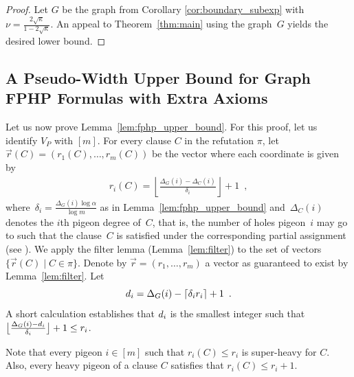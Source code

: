 \documentclass{theoretics}
\newcommand{\ceiling}[1]{\lceil #1 \rceil}
\newcommand{\Floor}[1]{\bigl \lfloor #1 \bigr \rfloor}
\newcommand{\FLOOR}[1]{\left \lfloor #1 \right \rfloor}
\newcommand{\set}[1]{\{ #1 \}}
\newcommand{\eqperiod}{\enspace .}
\newcommand{\eqcomma}{\enspace ,}
\newcommand{\refth}[1]{Theorem~\ref{#1}}
\newcommand{\reflem}[1]{Lemma~\ref{#1}}
\newcommand{\refpi}{\pi}
\newcommand{\heavy}{heavy\xspace}
\newcommand{\sheavy}{super-heavy\xspace}
\renewcommand{\deg}[2][XXXXXXXXXXXX]{\Delta_{#1}(#2)}
\newcommand{\V}[1][]{V_{#1}}
\newcommand{\Vp}{\V[P]}
\newcommand{\thr}[1]{ \ensuremath d_{{#1}} }
\newcommand{\adv}[1]{\delta_{{#1}}}
\newcommand{\PSEUDOWIDTH}{Pseudo-Width\xspace}
\newcommand{\ri}[1]{r_{#1}}
\newcommand{\riof}[2]{r_{#2}(#1)}
\newcommand{\vecr}{\vec{r}}
\newcommand{\vecrof}[1]{\vec{r}(#1)}
\newcommand{\vecrdef}[1]{\vecr = \left(\ri{1}, \ldots, \ri{#1}\right)}
\newcommand{\vecrofdef}[2]{\vecrof{#1} = 
\left(\riof{#1}{1}, \ldots, \riof{#1}{#2}\right)}
\newcommand{\squeezesubsection}[1]{\subsection{#1}}
\numberwithin{equation}{section}
\begin{document}
\begin{proof}
  Let $G$ be the graph from Corollary \ref{cor:boundary_subexp} with
  $\nu = \frac{ 2\sqrt{\kappa} }{ 1 - 2\sqrt{\kappa} }$.
  An appeal to \refth{thm:main} using the graph~$G$ yields 
  the desired lower bound.
\end{proof}






 
\squeezesubsection{A \PSEUDOWIDTH Upper Bound for Graph FPHP Formulas
  with Extra Axioms}
\label{sec:fphp_upper_bound}

Let us now prove \reflem{lem:fphp_upper_bound}.  For this proof, let
us identify $\Vp$ with $[m]$.  For every clause $C$ in the refutation
$\refpi$, let $\vecrofdef{C}{m}$ be the vector where each coordinate
is given by
\begin{align}
  \riof{C}{i} = \FLOOR{\frac{\deg[G]{i} - \deg[C]{i}}{\adv{i}}} + 1 \eqcomma
\end{align}
where~$\adv{i} = \frac{\deg[G]{i} \log \alpha}{\log m}$ as in
\reflem{lem:fphp_upper_bound} and~$\deg[C]{i}$ denotes the $i$th
pigeon degree of~$C$, that is, the number of holes pigeon~$i$ may go
to such that the clause~$C$ is satisfied under the corresponding
partial assignment (see ). We apply the filter lemma
(\reflem{lem:filter}) to the set of vectors
$\set{\vecrof{C} \mid C \in \refpi}$.  Denote by $\vecrdef{m}$ a
vector as guaranteed to exist by \reflem{lem:filter}.  Let
\begin{equation}
  \label{eq:def-d-i}
  \thr{i} = \deg[G]{i} - \ceiling{\adv{i} \ri{i}} + 1 \eqperiod
\end{equation}
A short calculation establishes that $\thr{i}$ is the smallest integer such that 
$\Floor{\frac{\deg[G]{i} - \thr{i}}{\adv{i}}} + 1 \le \ri{i}$.



Note that every pigeon $i \in [m]$
such that $\riof{C}{i} \le \ri{i}$
is 
\sheavy
for $C$. Also, every 
\heavy pigeon of a clause $C$
satisfies that $\riof{C}{i} \le \ri{i} + 1$. 
\end{document}
